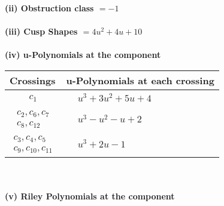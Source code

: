\documentclass[1p]{elsarticle_modified}
\theoremstyle{definition}
\begin{document}
\flushleft \textbf{(ii) Obstruction class $= -1$}\\~\\
\flushleft \textbf{(iii) Cusp Shapes $= 4 u^2+4 u+10$}\\~\\
\newpage\renewcommand{\arraystretch}{1}
\flushleft \textbf{(iv) u-Polynomials at the component}\newline \\
\begin{tabular}{m{50pt}|m{274pt}}
Crossings & \hspace{64pt}u-Polynomials at each crossing \\
\hline $$\begin{aligned}c_{1}\end{aligned}$$&$\begin{aligned}
&u^3+3 u^2+5 u+4
\end{aligned}$\\
\hline $$\begin{aligned}c_{2},c_{6},c_{7}\\c_{8},c_{12}\end{aligned}$$&$\begin{aligned}
&u^3- u^2- u+2
\end{aligned}$\\
\hline $$\begin{aligned}c_{3},c_{4},c_{5}\\c_{9},c_{10},c_{11}\end{aligned}$$&$\begin{aligned}
&u^3+2 u-1
\end{aligned}$\\
\hline
\end{tabular}\\~\\
\newpage\renewcommand{\arraystretch}{1}
\flushleft \textbf{(v) Riley Polynomials at the component}\newline \\
\end{document}
